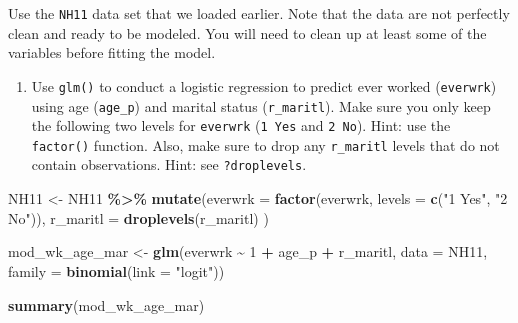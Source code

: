 \documentclass[
]{book}
\newenvironment{Shaded}{\begin{snugshade}}{\end{snugshade}}
\newcommand{\DataTypeTok}[1]{\textcolor[rgb]{0.13,0.29,0.53}{#1}}
\newcommand{\DecValTok}[1]{\textcolor[rgb]{0.00,0.00,0.81}{#1}}
\newcommand{\KeywordTok}[1]{\textcolor[rgb]{0.13,0.29,0.53}{\textbf{#1}}}
\newcommand{\NormalTok}[1]{#1}
\newcommand{\OperatorTok}[1]{\textcolor[rgb]{0.81,0.36,0.00}{\textbf{#1}}}
\newcommand{\StringTok}[1]{\textcolor[rgb]{0.31,0.60,0.02}{#1}}
\providecommand{\tightlist}{%
  \setlength{\itemsep}{0pt}\setlength{\parskip}{0pt}}
\begin{document}
\begin{alert}

Use the \texttt{NH11} data set that we loaded earlier. Note that the data are not perfectly clean and ready to be modeled. You will need to clean up at least some of the variables before fitting the model.

\begin{enumerate}
\def\labelenumi{\arabic{enumi}.}
\tightlist
\item
  Use \texttt{glm()} to conduct a logistic regression to predict ever worked (\texttt{everwrk}) using age (\texttt{age\_p}) and marital status (\texttt{r\_maritl}). Make sure you only keep the following two levels for \texttt{everwrk} (\texttt{1\ Yes} and \texttt{2\ No}). Hint: use the \texttt{factor()} function. Also, make sure to drop any \texttt{r\_maritl} levels that do not contain observations. Hint: see \texttt{?droplevels}.
\end{enumerate}

\begin{Shaded}
\begin{Highlighting}[]
\NormalTok{  NH11 \textless{}{-}}\StringTok{ }
\StringTok{      }\NormalTok{NH11 }\OperatorTok{\%\textgreater{}\%}
\StringTok{      }\KeywordTok{mutate}\NormalTok{(}\DataTypeTok{everwrk =} \KeywordTok{factor}\NormalTok{(everwrk, }\DataTypeTok{levels =} \KeywordTok{c}\NormalTok{(}\StringTok{"1 Yes"}\NormalTok{, }\StringTok{"2 No"}\NormalTok{)),}
             \DataTypeTok{r\_maritl =} \KeywordTok{droplevels}\NormalTok{(r\_maritl)}
\NormalTok{             )}

\NormalTok{  mod\_wk\_age\_mar \textless{}{-}}\StringTok{ }\KeywordTok{glm}\NormalTok{(everwrk }\OperatorTok{\textasciitilde{}}\StringTok{ }\DecValTok{1} \OperatorTok{+}\StringTok{ }\NormalTok{age\_p }\OperatorTok{+}\StringTok{ }\NormalTok{r\_maritl, }
                        \DataTypeTok{data =}\NormalTok{ NH11,}
                        \DataTypeTok{family =} \KeywordTok{binomial}\NormalTok{(}\DataTypeTok{link =} \StringTok{"logit"}\NormalTok{))}

  \KeywordTok{summary}\NormalTok{(mod\_wk\_age\_mar)}
\end{Highlighting}
\end{Shaded}


\end{alert}
\end{document}
